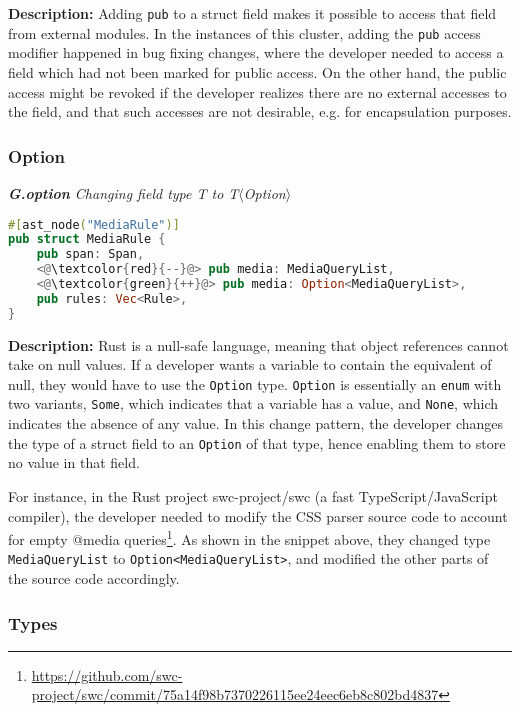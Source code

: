 \noindent\textbf{Description:} Adding \texttt{pub} to a struct field makes it possible to access that field from external modules. In the instances of this cluster, adding the \texttt{pub} access modifier happened in bug fixing changes, where the developer needed to access a field which had not been marked for public access. On the other hand, the public access might be revoked if the developer realizes there are no external accesses to the field, and that such accesses are not desirable, e.g. for encapsulation purposes.

\subsubsection{Option}
\vspace{3mm}

\noindent\textit{\textbf{G.option} Changing field type T to T$\langle$Option$\rangle$}

\begin{lstlisting}[language=Rust, style=colouredRust]
#[ast_node("MediaRule")]
pub struct MediaRule {
    pub span: Span,
    <@\textcolor{red}{--}@> pub media: MediaQueryList,
    <@\textcolor{green}{++}@> pub media: Option<MediaQueryList>,
    pub rules: Vec<Rule>,
}

\end{lstlisting}

\noindent\textbf{Description:} Rust is a null-safe language, meaning that object references cannot take on null values. If a developer wants a variable to contain the equivalent of null, they would have to use the \texttt{Option} type. \texttt{Option} is essentially an \texttt{enum} with two variants, \texttt{Some}, which indicates that a variable has a value, and \texttt{None}, which indicates the absence of any value. In this change pattern, the developer changes the type of a struct field to an \texttt{Option} of that type, hence enabling them to store no value in that field.

For instance, in the Rust project swc-project/swc (a fast TypeScript/JavaScript compiler), the developer needed to modify the CSS parser source code to account for empty @media queries\footnote{\scriptsize \url{https://github.com/swc-project/swc/commit/75a14f98b7370226115ee24eec6eb8c802bd4837}}. As shown in the snippet above, they changed type \texttt{MediaQueryList} to \verb+Option<MediaQueryList>+, and modified the other parts of the source code accordingly.


\subsubsection{Types}

